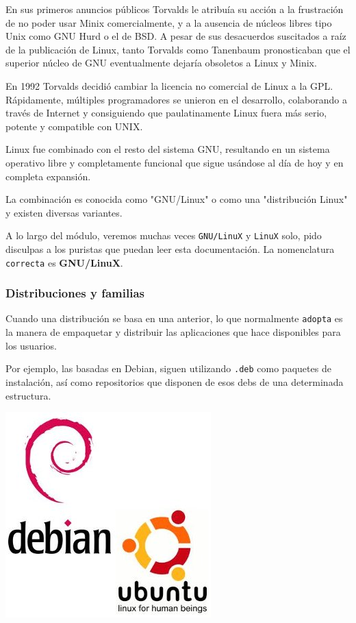 \documentclass[11pt]{article}
\begin{document}
En sus primeros anuncios públicos Torvalds le atribuía su acción a la
frustración de no poder usar Minix comercialmente, y a la ausencia de
núcleos libres tipo Unix como GNU Hurd​ o el de BSD. A pesar de sus
desacuerdos suscitados a raíz de la publicación de Linux, tanto Torvalds
como Tanenbaum pronosticaban que el superior núcleo de GNU eventualmente
dejaría obsoletos a Linux y Minix.

En 1992 Torvalds decidió cambiar la licencia no comercial de Linux a la
GPL. Rápidamente, múltiples programadores se unieron en el desarrollo,
colaborando a través de Internet y consiguiendo que paulatinamente Linux
fuera más serio, potente y compatible con UNIX.

Linux fue combinado con el resto del sistema GNU, resultando en un
sistema operativo libre y completamente funcional que sigue usándose al
día de hoy y en completa expansión.

La combinación es conocida como "GNU/Linux" o como una "distribución
Linux" y existen diversas variantes.

A lo largo del módulo, veremos muchas veces \texttt{GNU/LinuX} y \texttt{LinuX} solo,
pido disculpas a los puristas que puedan leer esta documentación. La
nomenclatura \texttt{correcta} es \textbf{GNU/LinuX}.

\subsubsection{Distribuciones y familias}
\label{sec:org97223fd}
Cuando una distribución se basa en una anterior, lo que normalmente
\texttt{adopta} es la manera de empaquetar y distribuir las aplicaciones que
hace disponibles para los usuarios.

Por ejemplo, las basadas en Debian, siguen utilizando \texttt{.deb} como
paquetes de instalación, así como repositorios que disponen de esos debs
de una determinada estructura.

\begin{center}
\includegraphics[width=.9\linewidth]{Versiones/debian_ubuntu.jpg}
\end{center}  
\end{document}
